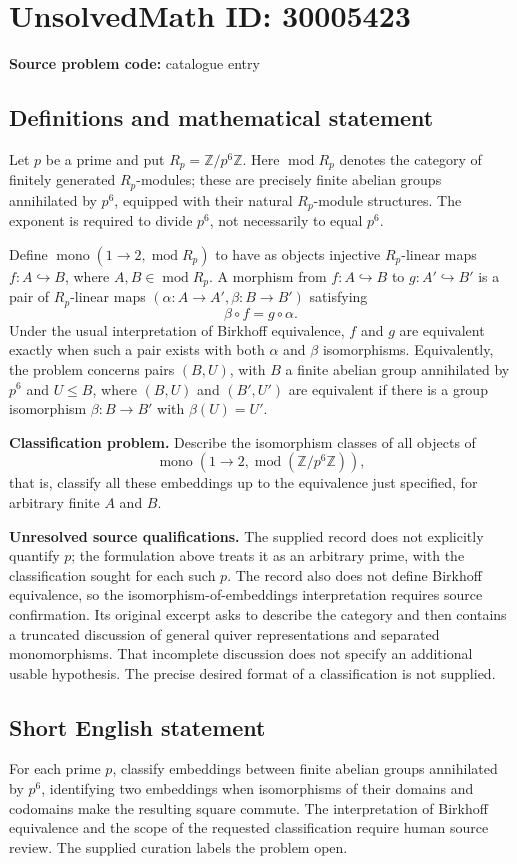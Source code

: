 \documentclass[11pt]{article}
\newcommand{\Z}{\mathbb{Z}}
\begin{document}
\section*{UnsolvedMath ID: 30005423}
\textbf{Source problem code:} catalogue entry
\subsection{Definitions and mathematical statement}
Let \(p\) be a prime and put \(R_p=\Z/p^6\Z\). Here \(\operatorname{mod}R_p\) denotes the category of finitely generated \(R_p\)-modules; these are precisely finite abelian groups annihilated by \(p^6\), equipped with their natural \(R_p\)-module structures. The exponent is required to divide \(p^6\), not necessarily to equal \(p^6\).

Define \(\operatorname{mono}(1\to2,\operatorname{mod}R_p)\) to have as objects injective \(R_p\)-linear maps \(f:A\hookrightarrow B\), where \(A,B\in\operatorname{mod}R_p\). A morphism from \(f:A\hookrightarrow B\) to \(g:A'\hookrightarrow B'\) is a pair of \(R_p\)-linear maps \((\alpha:A\to A',\beta:B\to B')\) satisfying
\[
\beta\circ f=g\circ\alpha.
\]
Under the usual interpretation of Birkhoff equivalence, \(f\) and \(g\) are equivalent exactly when such a pair exists with both \(\alpha\) and \(\beta\) isomorphisms. Equivalently, the problem concerns pairs \((B,U)\), with \(B\) a finite abelian group annihilated by \(p^6\) and \(U\leq B\), where \((B,U)\) and \((B',U')\) are equivalent if there is a group isomorphism \(\beta:B\to B'\) with \(\beta(U)=U'\).

\textbf{Classification problem.} Describe the isomorphism classes of all objects of
\[
\operatorname{mono}(1\to2,\operatorname{mod}(\Z/p^6\Z)),
\]
that is, classify all these embeddings up to the equivalence just specified, for arbitrary finite \(A\) and \(B\).

\textbf{Unresolved source qualifications.} The supplied record does not explicitly quantify \(p\); the formulation above treats it as an arbitrary prime, with the classification sought for each such \(p\). The record also does not define Birkhoff equivalence, so the isomorphism-of-embeddings interpretation requires source confirmation. Its original excerpt asks to describe the category and then contains a truncated discussion of general quiver representations and separated monomorphisms. That incomplete discussion does not specify an additional usable hypothesis. The precise desired format of a classification is not supplied.
\subsection{Short English statement}
For each prime \(p\), classify embeddings between finite abelian groups annihilated by \(p^6\), identifying two embeddings when isomorphisms of their domains and codomains make the resulting square commute. The interpretation of Birkhoff equivalence and the scope of the requested classification require human source review. The supplied curation labels the problem open.
\end{document}
